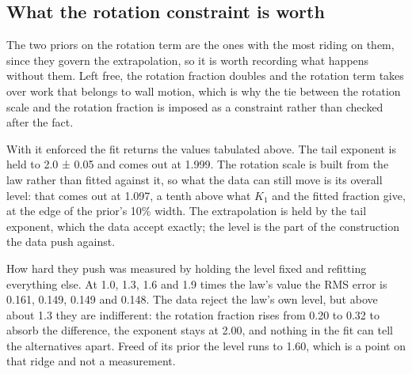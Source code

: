 \documentclass[
  11pt,
]{article}
\begin{document}
\subsection{What the rotation constraint is
worth}\label{what-the-rotation-constraint-is-worth}

The two priors on the rotation term are the ones with the most riding on them, since they govern the extrapolation, so it is worth recording what happens without them. Left free, the rotation fraction doubles and the rotation term takes over work that belongs to wall motion, which is why the tie between the rotation scale and the rotation fraction is imposed as a constraint rather than checked after the fact.

With it enforced the fit returns the values tabulated above. The tail exponent is held to 2.0 ± 0.05 and comes out at 1.999. The rotation scale is built from the law rather than fitted against it, so what the data can still move is its overall level: that comes out at 1.097, a tenth above what \(K_1\) and the fitted fraction give, at the edge of the prior's 10\% width. The extrapolation is held by the tail exponent, which the data accept exactly; the level is the part of the construction the data push against.

How hard they push was measured by holding the level fixed and refitting everything else. At 1.0, 1.3, 1.6 and 1.9 times the law's value the RMS error is 0.161, 0.149, 0.149 and 0.148. The data reject the law's own level, but above about 1.3 they are indifferent: the rotation fraction rises from 0.20 to 0.32 to absorb the difference, the exponent stays at 2.00, and nothing in the fit can tell the alternatives apart. Freed of its prior the level runs to 1.60, which is a point on that ridge and not a measurement.
\end{document}
